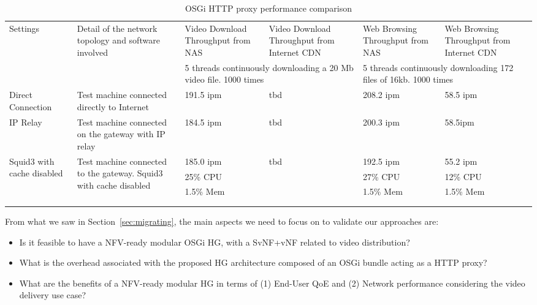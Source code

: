 \begin{table*}
	\centering
	\begin{tabular}{|p{}|p{}||p{}|p{}|p{}|p{}|}
		\hline
		\multirow{2}{0.10\textwidth}{Settings} & \multirow{2}{0.35\textwidth}{Detail of the network topology and software involved}   & Video Download Throughput from NAS       & Video Download Throughput from Internet CDN      & Web Browsing Throughput from NAS & Web Browsing Throughput from Internet CDN \\ \cline{3-6}
		 & & \multicolumn{2}{m{0.20\textwidth}|}{5 threads continuously downloading a 20 Mb video file. 1000 times} & \multicolumn{2}{m{0.20\textwidth}|}{5 threads continuously downloading 172 files of 16kb. 1000 times}\\\hline
		Direct Connection & Test machine connected directly to Internet & 191.5 ipm & tbd & 208.2 ipm & 58.5 ipm \\\hline
		IP Relay  & Test machine connected on the gateway with IP relay & 184.5 ipm & tbd & 200.3 ipm & 58.5ipm\\\hline
		\multirow{3}{0.10\textwidth}{Squid3 with cache disabled} & \multirow{3}{0.35\textwidth}{
		Test machine connected to the gateway. Squid3 with cache disabled} &185.0 ipm & \multirow{3}{*}{tbd} & 192.5 ipm & 55.2 ipm \\
		 & & 25\% CPU & & 27\% CPU & 12\% CPU \\
		 & & 1.5\% Mem & & 1.5\% Mem & 1.5\% Mem \\\hline
		
		&&&&&\\\hline
		&&&&&\\\hline
                                                
	\end{tabular}
	\caption{
	OSGi HTTP proxy performance comparison
	\label{tab:perf-comparison}
	}
	
\end{table*}


From what we saw in Section~\ref{sec:migrating}, the main aspects we need to focus on to validate our approaches are:
\begin{itemize}
	\item Is it feasible to have a NFV-ready modular OSGi HG, with a SvNF+vNF related to video distribution?
	\item What is the overhead associated with the proposed HG architecture composed of an OSGi bundle acting as a HTTP proxy?
	\item What are the benefits of a NFV-ready modular HG in terms of (1) End-User QoE and (2) Network performance considering the video delivery use case?
\end{itemize}


